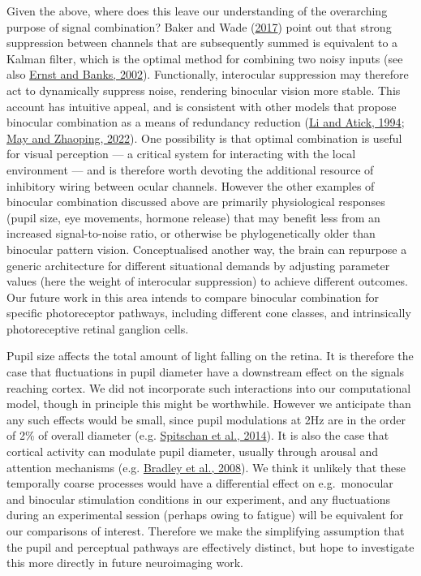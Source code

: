\documentclass[
]{article}
\begin{document}
Given the above, where does this leave our understanding of the overarching purpose of signal combination? Baker and Wade (\protect\hyperlink{ref-Baker2017}{2017}) point out that strong suppression between channels that are subsequently summed is equivalent to a Kalman filter, which is the optimal method for combining two noisy inputs (see also \protect\hyperlink{ref-Ernst2002}{Ernst and Banks, 2002}). Functionally, interocular suppression may therefore act to dynamically suppress noise, rendering binocular vision more stable. This account has intuitive appeal, and is consistent with other models that propose binocular combination as a means of redundancy reduction (\protect\hyperlink{ref-Li1994}{Li and Atick, 1994}; \protect\hyperlink{ref-May2022}{May and Zhaoping, 2022}). One possibility is that optimal combination is useful for visual perception --- a critical system for interacting with the local environment --- and is therefore worth devoting the additional resource of inhibitory wiring between ocular channels. However the other examples of binocular combination discussed above are primarily physiological responses (pupil size, eye movements, hormone release) that may benefit less from an increased signal-to-noise ratio, or otherwise be phylogenetically older than binocular pattern vision. Conceptualised another way, the brain can repurpose a generic architecture for different situational demands by adjusting parameter values (here the weight of interocular suppression) to achieve different outcomes. Our future work in this area intends to compare binocular combination for specific photoreceptor pathways, including different cone classes, and intrinsically photoreceptive retinal ganglion cells.

Pupil size affects the total amount of light falling on the retina. It is therefore the case that fluctuations in pupil diameter have a downstream effect on the signals reaching cortex. We did not incorporate such interactions into our computational model, though in principle this might be worthwhile. However we anticipate than any such effects would be small, since pupil modulations at 2Hz are in the order of 2\% of overall diameter (e.g. \protect\hyperlink{ref-Spitschan2014}{Spitschan et al., 2014}). It is also the case that cortical activity can modulate pupil diameter, usually through arousal and attention mechanisms (e.g. \protect\hyperlink{ref-Bradley2008}{Bradley et al., 2008}). We think it unlikely that these temporally coarse processes would have a differential effect on e.g.~monocular and binocular stimulation conditions in our experiment, and any fluctuations during an experimental session (perhaps owing to fatigue) will be equivalent for our comparisons of interest. Therefore we make the simplifying assumption that the pupil and perceptual pathways are effectively distinct, but hope to investigate this more directly in future neuroimaging work.
\end{document}

